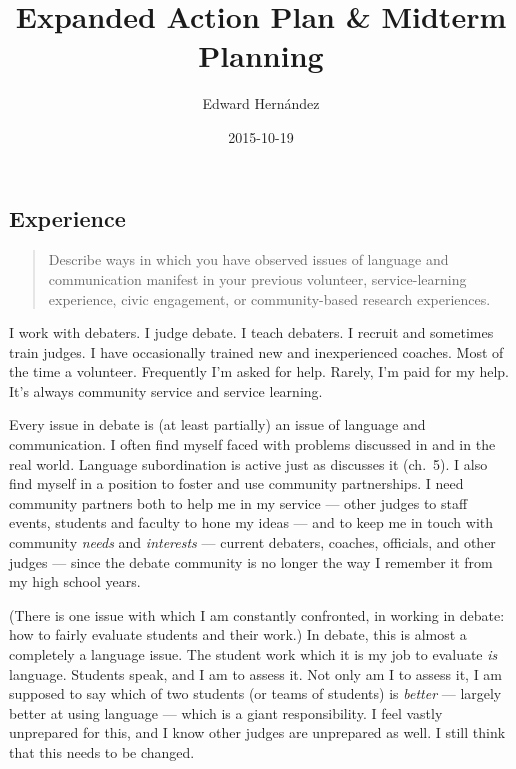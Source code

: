 \documentclass[man,12pt]{apa6}
\begin{document}
\title{Expanded Action Plan \& Midterm Planning}
\author{Edward Hern\'{a}ndez}
\date{2015-10-19}
\maketitle


\subsection{Experience}\label{experience}

\begin{quote}
	Describe ways in which you have observed issues of language and
	communication manifest in your previous volunteer, service-learning
	experience, civic engagement, or community-based research experiences.
\end{quote}

I work with debaters. I judge debate. I teach debaters. I recruit and sometimes
train judges. I have occasionally trained new and inexperienced coaches. Most
of the time a volunteer. Frequently I'm asked for help. Rarely, I'm paid for my
help. It's always community service and service learning.

Every issue in debate is (at least partially) an issue of language and
communication. I often find myself faced with problems discussed in
 and  in the real world. Language
subordination is active just as  discusses it (ch.~5). I
also find myself in a position to foster and use community partnerships. I need
community partners both to help me in my service --- other judges to staff
events, students and faculty to hone my ideas --- and to keep me in touch with
community \emph{needs} and \emph{interests} \cite[ch.~2]{Cress13} --- current
debaters, coaches, officials, and other judges --- since the debate community
is no longer the way I remember it from my high school years.

(There is one issue with which I am constantly confronted, in working in
debate: how to fairly evaluate students and their work.) In debate, this is
almost a completely a language issue. The student work which it is my job to
evaluate \emph{is} language. Students speak, and I am to assess it. Not only am
I to assess it, I am supposed to say which of two students (or teams of
students) is \emph{better} --- largely better at using language --- which is a
giant responsibility. I feel vastly unprepared for this, and I know other
judges are unprepared as well. I still think that this needs to be changed.
\end{document}
